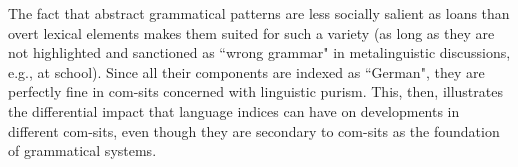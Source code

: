 The fact that abstract grammatical patterns are less socially salient as loans than overt lexical elements makes them suited for such a variety (as long as they are not highlighted and sanctioned as “wrong grammar" in metalinguistic discussions, e.g., at school). Since all their components are indexed as “German", they are perfectly fine in com-sits concerned with linguistic purism. This, then, illustrates the differential impact that language indices can have on developments in different com-sits, even though they are secondary to com-sits as the foundation of grammatical systems.


